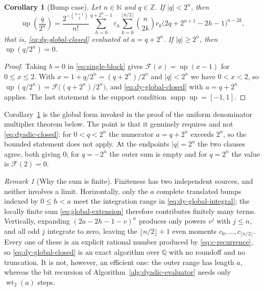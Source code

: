 \documentclass[11pt,oneside]{article}
\newtheorem{corollary}[theorem]{Corollary}
\theoremstyle{definition}
\theoremstyle{remark}
\newtheorem{remark}[theorem]{Remark}
\newcommand{\Q}{\mathbb Q}
\newcommand{\N}{\mathbb N}
\newcommand{\Z}{\mathbb Z}
\newcommand{\Up}{\operatorname{up}}
\newcommand{\wt}{\operatorname{wt}_2}
\newcommand{\supp}{\operatorname{supp}}
\begin{document}
\begin{corollary}[Bump case]
\label{cor:dy-bump-case}
Let $n\in\N$ and $q\in\Z$.  If $|q|<2^n$, then
\begin{equation}
 \Up\!\left(\frac q{2^n}\right)
 =\frac{2^{-\binom{n+1}{2}}}{n!}
 \sum_{h=0}^{q+2^n-1}\varepsilon_h
 \sum_{k=0}^{\lfloor n/2\rfloor}
 \binom n{2k}c_k\bigl(2q+2^{n+1}-2h-1\bigr)^{n-2k},
                                                               \label{eq:dy-bump-case}
\end{equation}
that is, \eqref{eq:dy-global-closed} evaluated at $a=q+2^n$.  If $|q|\ge2^n$, then
$\Up(q/2^n)=0$.
\end{corollary}

\begin{proof}
Taking $b=0$ in \eqref{eq:single-block} gives $\mathcal F(x)=\Up(x-1)$ for $0\le x\le2$.
With $x=1+q/2^n=(q+2^n)/2^n$ and $|q|<2^n$ we have $0<x<2$, so
$\Up(q/2^n)=\mathcal F\bigl((q+2^n)/2^n\bigr)$, and
\eqref{eq:dy-global-closed} with $a=q+2^n$ applies.  The last statement is the support
condition $\supp\Up=[-1,1]$.
\end{proof}

Corollary~\ref{cor:dy-bump-case} is the global form invoked in the proof of the uniform
denominator multiplier theorem below.  The point is that it genuinely requires
 and not \eqref{eq:dyadic-closed}: for $0<q<2^n$ the numerator
$a=q+2^n$ exceeds $2^n$, so the bounded statement does not apply.  At the endpoints
$|q|=2^n$ the two clauses agree, both giving $0$; for $q=-2^n$ the outer sum is empty and
for $q=2^n$ the value is $\mathcal F(2)=0$.

\begin{remark}[Why the sum is finite]
\label{rem:dy-finiteness}
Finiteness has two independent sources, and neither involves a limit.  Horizontally, only
the $a$ complete translated bumps indexed by $0\le h<a$ meet the integration range in
\eqref{eq:dy-global-integral}; the locally finite sum \eqref{eq:global-extension} therefore
contributes finitely many terms.  Vertically, expanding $(2a-2h-1-v)^n$ produces only
powers $v^j$ with $j\le n$, and all odd $j$ integrate to zero, leaving the
$\lfloor n/2\rfloor+1$ even moments $c_0,\ldots,c_{\lfloor n/2\rfloor}$.  Every one of these
is an explicit rational number produced by \eqref{eq:c-recurrence}, so
\eqref{eq:dy-global-closed} is an exact algorithm over $\Q$ with no roundoff and no
truncation.  It is not, however, an efficient one: the outer range has length $a$, whereas
the bit recursion of Algorithm~\ref{alg:dyadic-evaluator} needs only $\wt(a)$ steps.
\end{remark}
\end{document}

